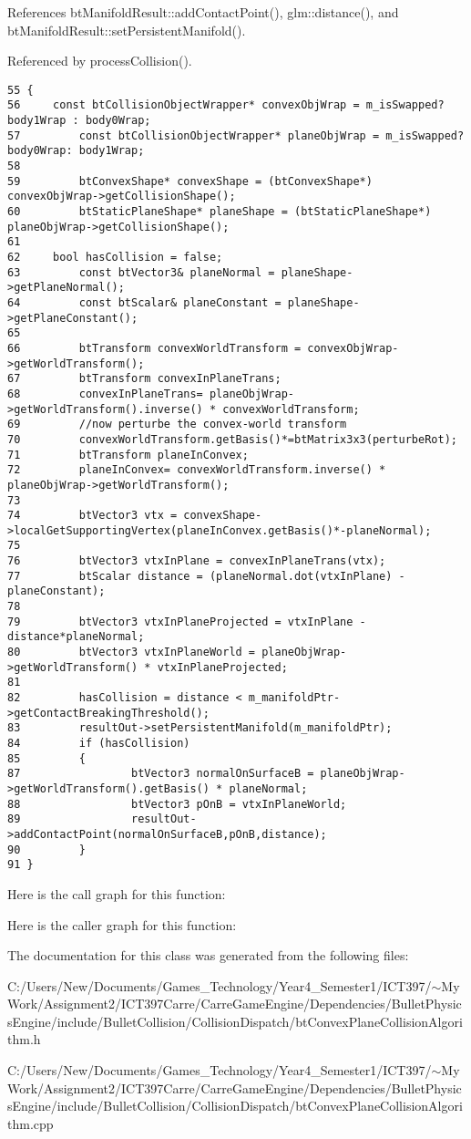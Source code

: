 References btManifoldResult::addContactPoint(), glm::distance(), and btManifoldResult::setPersistentManifold().

Referenced by processCollision().

\begin{Code}\begin{verbatim}55 {
56     const btCollisionObjectWrapper* convexObjWrap = m_isSwapped? body1Wrap : body0Wrap;
57         const btCollisionObjectWrapper* planeObjWrap = m_isSwapped? body0Wrap: body1Wrap;
58 
59         btConvexShape* convexShape = (btConvexShape*) convexObjWrap->getCollisionShape();
60         btStaticPlaneShape* planeShape = (btStaticPlaneShape*) planeObjWrap->getCollisionShape();
61 
62     bool hasCollision = false;
63         const btVector3& planeNormal = planeShape->getPlaneNormal();
64         const btScalar& planeConstant = planeShape->getPlaneConstant();
65         
66         btTransform convexWorldTransform = convexObjWrap->getWorldTransform();
67         btTransform convexInPlaneTrans;
68         convexInPlaneTrans= planeObjWrap->getWorldTransform().inverse() * convexWorldTransform;
69         //now perturbe the convex-world transform
70         convexWorldTransform.getBasis()*=btMatrix3x3(perturbeRot);
71         btTransform planeInConvex;
72         planeInConvex= convexWorldTransform.inverse() * planeObjWrap->getWorldTransform();
73         
74         btVector3 vtx = convexShape->localGetSupportingVertex(planeInConvex.getBasis()*-planeNormal);
75 
76         btVector3 vtxInPlane = convexInPlaneTrans(vtx);
77         btScalar distance = (planeNormal.dot(vtxInPlane) - planeConstant);
78 
79         btVector3 vtxInPlaneProjected = vtxInPlane - distance*planeNormal;
80         btVector3 vtxInPlaneWorld = planeObjWrap->getWorldTransform() * vtxInPlaneProjected;
81 
82         hasCollision = distance < m_manifoldPtr->getContactBreakingThreshold();
83         resultOut->setPersistentManifold(m_manifoldPtr);
84         if (hasCollision)
85         {
87                 btVector3 normalOnSurfaceB = planeObjWrap->getWorldTransform().getBasis() * planeNormal;
88                 btVector3 pOnB = vtxInPlaneWorld;
89                 resultOut->addContactPoint(normalOnSurfaceB,pOnB,distance);
90         }
91 }
\end{verbatim}
\end{Code}




Here is the call graph for this function:

Here is the caller graph for this function:

The documentation for this class was generated from the following files:\begin{CompactItemize}
\item 
C:/Users/New/Documents/Games\_\-Technology/Year4\_\-Semester1/ICT397/$\sim$My Work/Assignment2/ICT397Carre/CarreGameEngine/Dependencies/BulletPhysicsEngine/include/BulletCollision/CollisionDispatch/btConvexPlaneCollisionAlgorithm.h\item 
C:/Users/New/Documents/Games\_\-Technology/Year4\_\-Semester1/ICT397/$\sim$My Work/Assignment2/ICT397Carre/CarreGameEngine/Dependencies/BulletPhysicsEngine/include/BulletCollision/CollisionDispatch/btConvexPlaneCollisionAlgorithm.cpp\end{CompactItemize}
